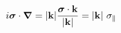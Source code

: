 \begin{equation}
i \mbox{\boldmath $\sigma$} \cdot \mbox{\boldmath $\nabla$} = |{\bf k}| 
\frac{\mbox{\boldmath $\sigma$} \cdot {\bf k}}{|{\bf k}|}=
|{\bf k}| ~\sigma_{\parallel} 
\end{equation}

